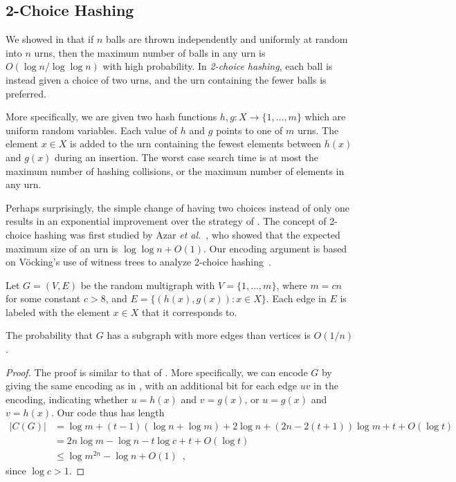 \documentclass[prodmode,acmcsur]{acmsmall}
\begin{document}
\subsection{2-Choice Hashing}

We showed in  that if $n$ balls are thrown independently
and uniformly at random into $n$ urns, then the maximum number of
balls in any urn is $O(\log n/\log \log n)$ with high probability. In
\emph{2-choice hashing}, each ball is instead given a choice of two
urns, and the urn containing the fewer balls is preferred.

More specifically, we are given two hash functions $h, g : X \to \{1,
\ldots, m\}$ which are uniform random variables. Each value of $h$ and
$g$ points to one of $m$ urns. The element $x \in X$ is added to the
urn containing the fewest elements between $h(x)$ and $g(x)$ during an
insertion. The worst case search time is at most the maximum number of
hashing collisions, or the maximum number of elements in any urn.

Perhaps surprisingly, the simple change of having two choices instead
of only one results in an exponential improvement over the strategy of
. The concept of 2-choice hashing was first studied by 
Azar \emph{et
  al.}~\cite{azar:multiplechoice}, who showed that the expected
maximum size of an urn is $\log \log n + O(1)$. Our encoding argument
is based on V\"{o}cking's use of witness trees to analyze 2-choice
hashing~\cite{vocking:witness}.

Let $G = (V, E)$ be the random multigraph with $V = \{1, \ldots, m\}$,
where $m = cn$ for some constant $c > 8$, and
$E = \{(h(x), g(x)) : x \in X\}$. Each edge in $E$ is
labeled with the element $x \in X$ that it corresponds to.

\begin{lem}
  The probability that $G$ has a subgraph with more edges than 
  vertices is
  $O(1/n)$.
\end{lem}
\begin{proof}
  The proof is similar to that of . More
  specifically, we can encode $G$ by giving the same encoding as in
  , with an additional bit for each edge $uv$
  in the encoding, indicating whether $u = h(x)$ and $v = g(x)$, or $u
  = g(x)$ and $v = h(x)$. Our code thus has length
  \begin{align*}
    |C(G)| &= \log m + (t - 1)(\log n + \log m) + 2 \log n + (2n - 2(t + 1))\log m + t + O(\log t) \\
           &= 2n \log m - \log n - t \log c + t + O(\log t) \\
           &\le \log m^{2n} - \log n + O(1) \enspace ,
  \end{align*}
  since $\log c > 1$.
\end{proof}
\end{document}
